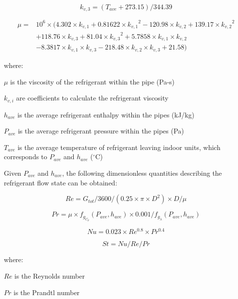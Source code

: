 \begin{equation}
k_{v,3} = (T_{ave}+273.15)/344.39
\end{equation}

\begin{equation}
\begin{array}{rl}
\mu =& 10^6\times(4.302\times{k_{v,1}}+0.81622\times{k_{v,1}}^2-120.98\times{k_{v,2}}+139.17\times{k_{v,2}}^2 \\
 & +118.76\times{k_{v,3}}+81.04\times{k_{v,3}}^2+5.7858\times{k_{v,1}}\times{k_{v,2}} \\
 & -8.3817\times{k_{v,1}}\times{k_{v,3}}-218.48\times{k_{v,2}}\times{k_{v,3}}+21.58)
\end{array}
\end{equation}

where:

\(\mu\) is the viscosity of the refrigerant within the pipe (Pa-s)

\(k_{v,i}\) are coefficients to calculate the refrigerant viscosity

\(h_{ave}\) is the average refrigerant enthalpy within the pipes (kJ/kg)

\(P_{ave}\) is the average refrigerant pressure within the pipes (Pa)

\(T_{ave}\) is the average temperature of refrigerant leaving indoor units, which corresponds to \(P_{ave}\) and \(h_{ave}\) (\(^{\circ}\)C)

Given \(P_{ave}\) and \(h_{ave}\), the following dimensionless quantities describing the refrigerant flow state can be obtained:

\begin{equation}
Re = G_{tot}/3600/(0.25\times\pi\times{D^2})\times{D}/\mu
\end{equation}

\begin{equation}
Pr = \mu\times{f_{g_{C_p}}(P_{ave},h_{ave})}\times{0.001}/f_{g_\lambda}(P_{ave},h_{ave})
\end{equation}

\begin{equation}
Nu = 0.023\times{Re^{0.8}\times{Pr^{0.4}}}
\end{equation}

\begin{equation}
St = Nu/Re/Pr
\end{equation}

where:

\(Re\) is the Reynolds number

\(Pr\) is the Prandtl number

